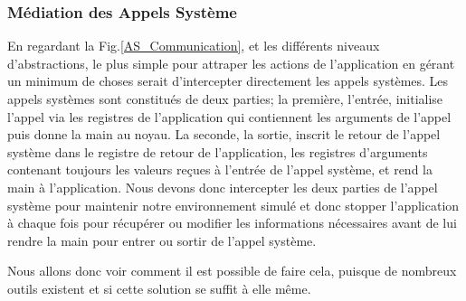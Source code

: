     

\subsubsection{Médiation des Appels Système}

En regardant la Fig.\ref{AS_Communication}, et les différents niveaux
d'abstractions, le plus simple pour attraper les actions de l'application en
gérant un minimum de choses serait d'intercepter directement les appels
systèmes.  Les appels systèmes sont constitués de deux parties; la première,
l'entrée, initialise l'appel via les registres de l'application qui contiennent
les arguments de l'appel puis donne la main au noyau. La seconde, la sortie,
inscrit le retour de l'appel système dans le registre de retour de
l'application, les registres d'arguments contenant toujours les valeurs reçues à
l'entrée de l'appel système, et rend la main à l'application. Nous devons donc
intercepter les deux parties de l'appel système pour maintenir notre
environnement simulé et donc stopper l'application à chaque fois pour récupérer
ou modifier les informations nécessaires avant de lui rendre la main pour entrer
ou sortir de l'appel système.

 Nous allons donc voir comment il est possible de faire cela, puisque de
 nombreux outils existent {\color{red}et si cette solution se suffit à elle
   même.}
 
